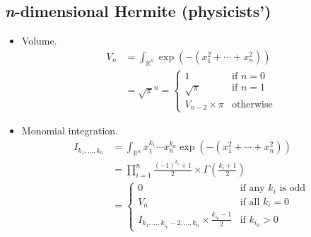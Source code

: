 \documentclass[final]{scrartcl}
\begin{document}
\subsection*{\textit{n}-dimensional Hermite (physicists')}
\begin{itemize}
  \item Volume.
\begin{align}\nonumber
  V_n
  &= \int_{\mathbb{R}^n} \exp\left(-(x_1^2+\cdots+x_n^2)\right)\\
  &= \sqrt{\pi}^n
   = \begin{cases}
     1&\text{if $n=0$}\\
     \sqrt{\pi}&\text{if $n=1$}\\
     V_{n-2} \times \pi&\text{otherwise}
   \end{cases}
\end{align}

  \item Monomial integration.
\begin{align}\nonumber
    I_{k_1,\dots,k_n}
    &= \int_{\mathbb{R}^n} x_1^{k_1}\cdots x_n^{k_n} \exp(-(x_1^2+\cdots+x_n^2))\\
    &= \prod_{i=1}^n \frac{(-1)^{k_i} + 1}{2} \times \Gamma\left(\frac{k_i+1}{2}\right)\\
    &=\begin{cases}
      0&\text{if any $k_i$ is odd}\\
      V_n&\text{if all $k_i=0$}\\
      I_{k_1,\dots,k_{i_0}-2,\dots,k_n} \times \frac{k_{i_0} - 1}{2}&\text{if $k_{i_0} > 0$}
    \end{cases}
\end{align}
\end{itemize}
\end{document}
